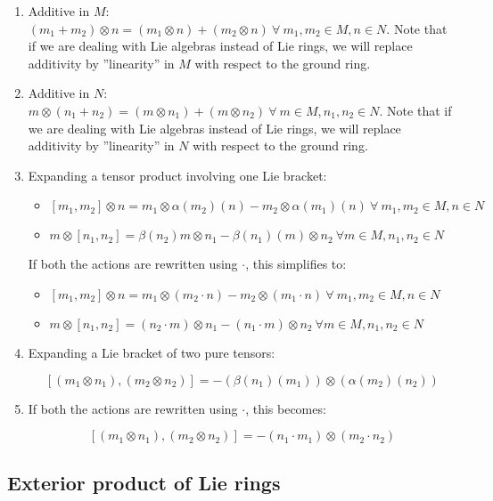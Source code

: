 \documentclass{ucetd}
\begin{document}
\begin{enumerate}
\item Additive in $M$: $(m_1 + m_2) \otimes n = (m_1 \otimes n) + (m_2
  \otimes n) \ \forall \ m_1,m_2 \in M, n \in N$. Note that if we are
  dealing with Lie algebras instead of Lie rings, we will replace
  additivity by ''linearity'' in $M$ with respect to the ground ring.
\item Additive in $N$: $m \otimes (n_1 + n_2) = (m \otimes n_1) + (m \otimes n_2) \ \forall \ m \in M, n_1,n_2 \in N$. Note that if we are dealing with Lie algebras instead of Lie rings, we will replace additivity by ''linearity'' in $N$ with respect to the ground ring.
\item Expanding a tensor product involving one Lie bracket: 
  \begin{itemize}
  \item $[m_1,m_2] \otimes n = m_1 \otimes \alpha(m_2)(n) - m_2 \otimes
    \alpha(m_1)(n) \ \forall \ m_1,m_2 \in M, n \in N$
  \item $m \otimes [n_1,n_2] = \beta(n_2)m \otimes n_1 - \beta(n_1)(m)
    \otimes n_2 \ \forall m \in M, n_1,n_2 \in N$
  \end{itemize}
  If both the actions are rewritten using $\cdot$, this simplifies to:
  
  \begin{itemize}
  \item $[m_1,m_2] \otimes n = m_1 \otimes (m_2 \cdot n) - m_2 \otimes (m_1 \cdot n) \ \forall \ m_1,m_2 \in M, n \in N$
  \item $m \otimes [n_1,n_2] = (n_2 \cdot m) \otimes n_1 - (n_1 \cdot m) \otimes n_2 \ \forall m \in M, n_1,n_2 \in N$
  \end{itemize}
\item Expanding a Lie bracket of two pure tensors:

  $$[(m_1 \otimes n_1),(m_2 \otimes n_2)] = -(\beta(n_1)(m_1)) \otimes (\alpha(m_2)(n_2))$$
\item If both the actions are rewritten using $\cdot$, this becomes:

  $$[(m_1 \otimes n_1),(m_2 \otimes n_2)] = -(n_1 \cdot m_1) \otimes (m_2 \cdot n_2)$$
\end{enumerate}

\subsection{Exterior product of Lie rings}\label{sec:exteriorsquare-explicit-lie}
\end{document}
